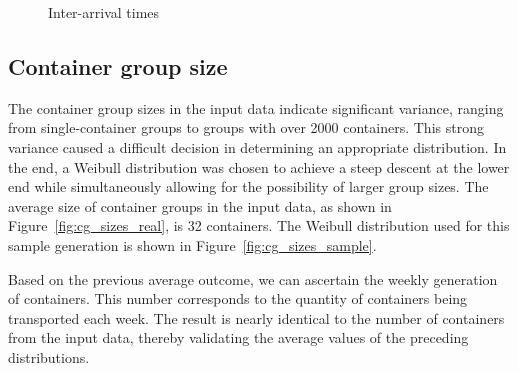 \documentclass{article}
\begin{document}
\begin{figure}[!tbp]
    \centering
    \hfill
    \caption{Inter-arrival times}
\end{figure}

\subsection{Container group size}
The container group sizes in the input data indicate significant variance,
ranging from single-container groups to groups with over 2000 containers. This
strong variance caused a difficult decision in determining an appropriate
distribution. In the end, a Weibull distribution was chosen to achieve a steep
descent at the lower end while simultaneously allowing for the possibility of
larger group sizes. The average size of container groups in the input data, as
shown in Figure~\ref{fig:cg_sizes_real}, is 32 containers. The Weibull
distribution used for this sample generation is shown in
Figure~\ref{fig:cg_sizes_sample}.

Based on the previous average outcome, we can ascertain the weekly generation
of containers. This number corresponds to the quantity of containers being
transported each week. The result is nearly identical to the number of
containers from the input data, thereby validating the average values of the
preceding distributions.
\end{document}
